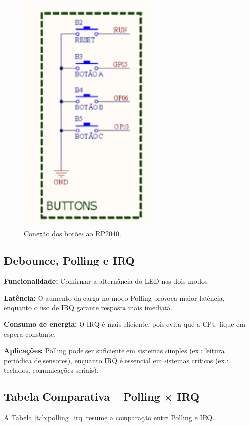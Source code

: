 \documentclass{article}
\begin{document}
\begin{figure}[H]
    \centering
    \includegraphics[width=0.6\textwidth]{circuito_botoes.png}
    \caption{Conexão dos botões ao RP2040.}
    \label{fig:circuito_botoes}
\end{figure}

\subsection{Debounce, Polling e IRQ}
\textbf{Funcionalidade:} Confirmar a alternância do LED nos dois modos.  

\textbf{Latência:} O aumento da carga no modo Polling provoca maior latência, enquanto o uso de IRQ garante resposta mais imediata.  

\textbf{Consumo de energia:} O IRQ é mais eficiente, pois evita que a CPU fique em espera constante.  

\textbf{Aplicações:} Polling pode ser suficiente em sistemas simples (ex.: leitura periódica de sensores), enquanto IRQ é essencial em sistemas críticos (ex.: teclados, comunicações seriais).  

\subsection{Tabela Comparativa -- Polling × IRQ}
A Tabela \ref{tab:polling_irq} resume a comparação entre Polling e IRQ.  
\end{document}

